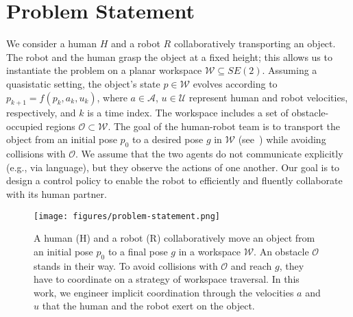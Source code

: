 \section{Problem Statement}\label{sec:problem-statement}

We consider a human $H$ and a robot $R$ collaboratively transporting an object. The robot and the human grasp the object at a fixed height; this allows us to instantiate the problem on a planar workspace $\mathcal{W}\subseteq SE(2)$.
Assuming a quasistatic setting, the object's state $p \in \mathcal{W}$ evolves according to $p_{k+1} = f(p_k, a_k, u_k)$, where $a\in\mathcal{A}$, $u\in\mathcal{U}$ represent human and robot velocities, respectively, and $k$ is a time index.
The workspace includes a set of obstacle-occupied regions $\mathcal{O}\subset\mathcal{W}$. The goal of the human-robot team is to transport the object from an initial pose $p_0$ to a desired pose $g$ in $\mathcal{W}$ (see~) while avoiding collisions with $\mathcal{O}$. We assume that the two agents do not communicate explicitly (e.g., via language), but they observe the actions of one another. Our goal is to design a control policy to enable the robot to efficiently and fluently collaborate with its human partner.


\begin{figure}[t]
  \texttt{[image: figures/problem-statement.png]}
  \caption{A human (H) and a robot (R) collaboratively move an object from an initial pose $p_0$ to a final pose $g$ in a workspace $\mathcal{W}$. An obstacle $\mathcal{O}$ stands in their way. To avoid collisions with $\mathcal{O}$ and reach $g$, they have to coordinate on a strategy of workspace traversal. In this work, we engineer implicit coordination through the velocities $a$ and $u$ that the human and the robot exert on the object.
  }
  \label{fig:setup}
\end{figure}
